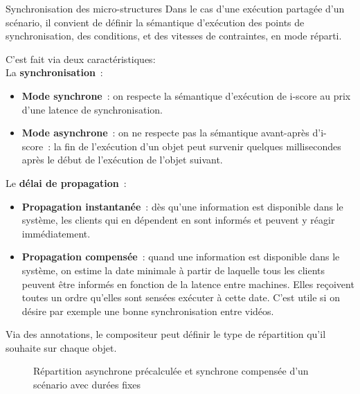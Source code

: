 \begin{block}{Synchronisation des micro-structures}
    Dans le cas d'une exécution partagée d'un scénario, il convient de définir la sémantique d'exécution des points de synchronisation, des conditions, et des vitesses de contraintes, en mode réparti. 
   
    C'est fait via deux caractéristiques:~\\
    La \textbf{synchronisation}~:
	\begin{itemize}
		\item \textbf{Mode synchrone}~: on respecte la sémantique d'exécution de i-score au prix d'une latence de synchronisation.
		\item \textbf{Mode asynchrone}~: on ne respecte pas la sémantique avant-après d'i-score~: la fin de l'exécution d'un objet peut survenir quelques millisecondes après le début de l'exécution de l'objet suivant.
	\end{itemize}

Le \textbf{délai de propagation}~:
\begin{itemize}
    \item \textbf{Propagation instantanée}~: dès qu'une information est disponible dans le système, les clients qui en dépendent en sont informés et peuvent y réagir immédiatement. 
    \item \textbf{Propagation compensée}~: quand une information est disponible dans le système, on estime la date minimale à partir de laquelle tous les clients peuvent être informés en fonction de la latence entre machines. Elles reçoivent toutes un ordre qu'elles sont sensées exécuter à cette date. C'est utile si on désire par exemple une bonne synchronisation entre vidéos.
\end{itemize}

Via des annotations, le compositeur peut définir le type de répartition qu'il souhaite sur chaque objet.

\begin{figure}
	\begin{tikzpicture}[scale=4]
	
	\end{tikzpicture}
	\begin{tikzpicture}[scale=4]
	
	\end{tikzpicture}
	\begin{tikzpicture}[scale=4]
	
	\end{tikzpicture}
	\caption{Répartition asynchrone précalculée et synchrone compensée d'un scénario avec durées fixes}
\end{figure}
\end{block}
